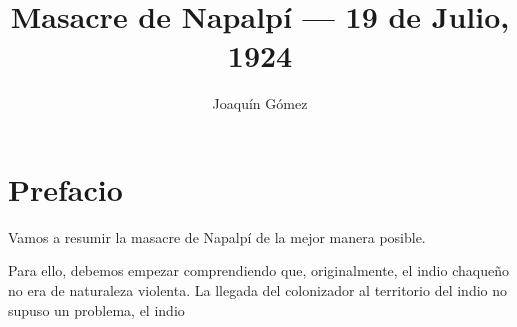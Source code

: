 \documentclass{article}
\author{Joaquín Gómez}
\title{Masacre de Napalpí --- 19 de Julio, 1924}
\begin{document}
\maketitle

\section{Prefacio}

Vamos a resumir la masacre de Napalpí de la mejor manera posible.

Para ello, debemos empezar comprendiendo que, originalmente, el indio chaqueño no era de naturaleza violenta. La llegada del colonizador al territorio del indio no supuso un problema, el indio
\end{document}
